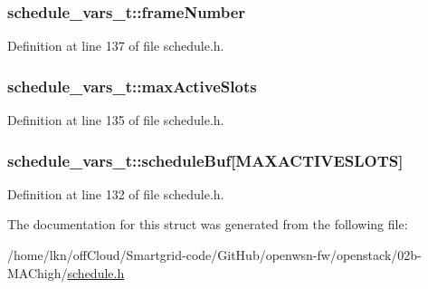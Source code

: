 \subsubsection[{\texorpdfstring{frame\+Number}{frameNumber}}]{ schedule\+\_\+vars\+\_\+t\+::frame\+Number}\hypertarget{structschedule__vars__t_a411d136c167ac38a1b275a04f635f346}{}\label{structschedule__vars__t_a411d136c167ac38a1b275a04f635f346}


Definition at line 137 of file schedule.\+h.

\subsubsection[{\texorpdfstring{max\+Active\+Slots}{maxActiveSlots}}]{ schedule\+\_\+vars\+\_\+t\+::max\+Active\+Slots}\hypertarget{structschedule__vars__t_ab93c6951abd5fd6fecabe15b5faf7644}{}\label{structschedule__vars__t_ab93c6951abd5fd6fecabe15b5faf7644}


Definition at line 135 of file schedule.\+h.

\subsubsection[{\texorpdfstring{schedule\+Buf}{scheduleBuf}}]{ schedule\+\_\+vars\+\_\+t\+::schedule\+Buf\mbox{[}{\bf M\+A\+X\+A\+C\+T\+I\+V\+E\+S\+L\+O\+TS}\mbox{]}}\hypertarget{structschedule__vars__t_a05b00ed294afeac2f3e2525231039a5c}{}\label{structschedule__vars__t_a05b00ed294afeac2f3e2525231039a5c}


Definition at line 132 of file schedule.\+h.



The documentation for this struct was generated from the following file\+:\begin{DoxyCompactItemize}
\item 
/home/lkn/off\+Cloud/\+Smartgrid-\/code/\+Git\+Hub/openwsn-\/fw/openstack/02b-\/\+M\+A\+Chigh/\hyperlink{schedule_8h}{schedule.\+h}\end{DoxyCompactItemize}
